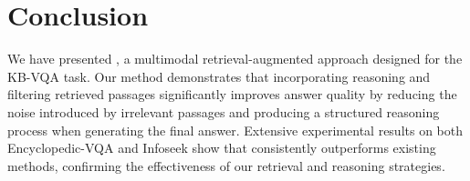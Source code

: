 \section{Conclusion}
We have presented \ours, a multimodal retrieval-augmented approach designed for the KB-VQA task. Our method demonstrates that incorporating reasoning and filtering retrieved passages significantly improves answer quality by reducing the noise introduced by irrelevant passages and producing a structured reasoning process when generating the final answer. Extensive experimental results on both Encyclopedic-VQA and Infoseek show that \ours consistently outperforms existing methods, confirming the effectiveness of our retrieval and reasoning strategies.
